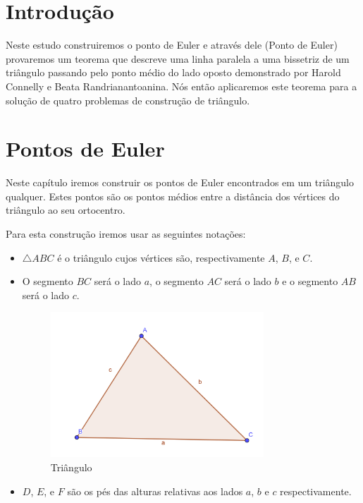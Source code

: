 \documentclass[12pt, openright, a4paper, brazil, openany, oneside]{abntex2}
\begin{document}


\frenchspacing 
\imprimircapa
\imprimirfolhaderosto*
\ABNTEXchapterfont
{}
\tableofcontents*
\cleardoublepage
\textual

\chapter*[Introdução]{Introdução}


Neste estudo construiremos o ponto de Euler e através dele (Ponto de Euler) provaremos um teorema que descreve uma linha paralela a uma bissetriz de um triângulo passando pelo ponto médio do lado oposto demonstrado por Harold Connelly e Beata Randrianantoanina\cite{con2}. Nós então aplicaremos este teorema para a solução de quatro problemas de construção de triângulo.



\chapter{Pontos de Euler}

Neste capítulo iremos construir os pontos de Euler encontrados em um triângulo qualquer. Estes pontos são os pontos médios entre a distância dos vértices do triângulo ao seu ortocentro.

Para esta construção iremos usar as seguintes notações:

\begin{itemize}
\item $\triangle ABC$ é o triângulo cujos vértices são, respectivamente $A$, $B$, e $C$.
\item O segmento $BC$ será o lado $a$, o segmento $AC$ será o lado $b$ e o segmento $AB$ será o lado $c$.

\begin{figure}[h]

    \center

    \includegraphics[width=8cm]{triangulo1.png}
    \caption{Triângulo \label{tria1}}
    
\end{figure}

\item $D$, $E$, e $F$ são os pés das alturas relativas aos lados $a$, $b$ e $c$ respectivamente.


\end{itemize} 
\end{document}
